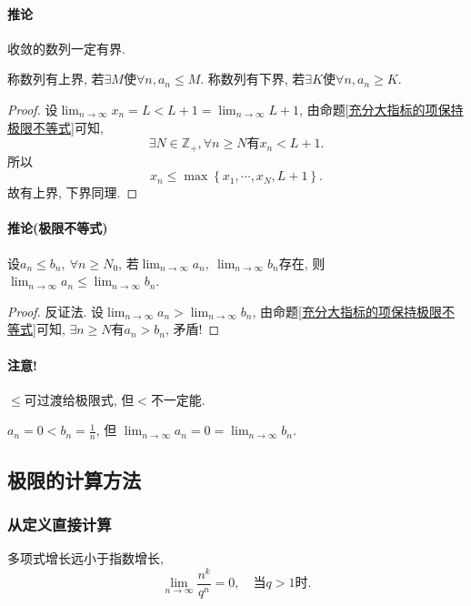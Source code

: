 \paragraph{推论}收敛的数列一定有界.
\begin{definition}
    称数列有上界, 若$\exists M \text{使} \forall n, a_n \le  M$.
    称数列有下界, 若$\exists K \text{使} \forall n, a_n \ge  K$.
\end{definition}
\begin{proof}
    设$\displaystyle \lim_{n \to \infty} x_n = L < L +1 = \lim_{n \to \infty} L +1$, 由命题\ref{充分大指标的项保持极限不等式}可知, 
    \begin{equation}
      \exists  N \in  \mathbb{Z}_{+} , \forall n \ge N \text{有} x_n < L+1.
    \end{equation}
    所以
    \begin{equation}
      x_n \le \max\left\{ x_1, \cdots  ,x_N, L+1 \right\}. 
    \end{equation}
    故有上界, 下界同理.
\end{proof}

\paragraph{推论(极限不等式)} 设$a_n\le b_n , \ \forall  n \ge  N_0$, 若$\lim_{n \to \infty}a_n, \ \lim_{n \to \infty} b_n$存在, 则$\displaystyle \lim_{n \to \infty}a_n \le \lim_{n \to \infty}b_n$.
\begin{proof}
    反证法. 设$\displaystyle \lim_{n \to \infty}a_n > \lim_{n \to \infty} b_n$, 由命题\ref{充分大指标的项保持极限不等式}可知, $\exists n \ge N$有$a_n > b_n$, 矛盾!
\end{proof}

\paragraph{注意!} $\le $可过渡给极限式, 但$<$不一定能.

\begin{example}
    $a_n = 0 < b_n = \frac{1}{n}$, 但 $\displaystyle \lim_{n \to \infty} a_n = 0 =\lim_{n \to \infty} b_n$.
\end{example}

\subsection{极限的计算方法}
\subsubsection{从定义直接计算}
\begin{example}
    多项式增长远小于指数增长,
    \begin{equation}
      \lim_{n \to \infty} \frac{n^{k}}{q^{n}} = 0, \quad \text{当}q>1\text{时}.
    \end{equation}
\end{example}
